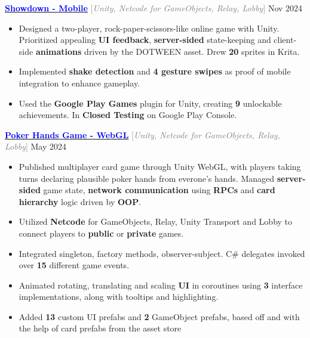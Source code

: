 \documentclass[9pt]{developercv} %
\begin{document}
\begin{minipage}[t]{\textwidth}
	\vspace{-\baselineskip}
	\textbf{\href{https://youtube.com/shorts/Q4wsoV7939M}{\textcolor{blue}{Showdown - Mobile}}} \quad \textcolor{gray}{[\;\textit{Unity, Netcode for GameObjects, Relay, Lobby}\;]} \hfill Nov 2024
	\begin{itemize}[noitemsep,topsep=0pt]
		\item Designed a two-player, rock-paper-scissors-like online game with Unity. Prioritized appealing \textbf{UI feedback},
		\textbf{server-sided} state-keeping and client-side \textbf{animations} driven by the DOTWEEN asset.
		Drew \textbf{20} sprites in Krita.
		\item Implemented \textbf{shake detection} and \textbf{4 gesture swipes} as proof of mobile integration to enhance gameplay.
		\item Used the \textbf{Google Play Games} plugin for Unity, creating \textbf{9} unlockable achievements. In \textbf{Closed Testing} on Google Play Console.
	\end{itemize}
	\vspace{0.3em}

	\textbf{\href{https://henryhu.dev/pokerbsgame/index.html}{\textcolor{blue}{Poker Hands Game - WebGL}}} \quad \textcolor{gray}{[\;\textit{Unity, Netcode for GameObjects, Relay, Lobby}\;]} \hfill May 2024
	\begin{itemize}[noitemsep,topsep=0pt]
		\item Published multiplayer card game through Unity WebGL, with players taking turns declaring plausible poker hands from everone's hands.
		Managed \textbf{server-sided} game state, \textbf{network communication} using \textbf{RPCs} and \textbf{card hierarchy} logic driven by \textbf{OOP}.
		\item Utilized \textbf{Netcode} for GameObjects, Relay, Unity Transport and Lobby to connect players to \textbf{public} or \textbf{private} games.
		\item Integrated singleton, factory methods, observer-subject. C\# delegates invoked over \textbf{15} different game events.
		\item Animated rotating, translating and scaling \textbf{UI} in coroutines using \textbf{3} interface implementations, along with tooltips and highlighting.
		\item Added \textbf{13} custom UI prefabs and \textbf{2} GameObject prefabs, based off and with the help of card prefabs from the asset store
	\end{itemize}
	\vspace{0.3em}


\end{minipage}
\end{document}
